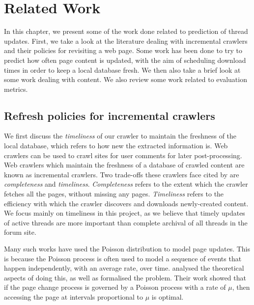 \chapter{Related Work}
In this chapter, we present some of the work done related to prediction of 
thread updates. First, we take a look at the literature dealing with incremental 
crawlers and their policies for revisiting a web page. Some work has been done 
to try to predict how often page content is updated, with the aim of scheduling 
download times in order to keep a local database fresh. We then also take a 
brief look at some work dealing with content. We also review some work related 
to evaluation metrics.

 


\section{Refresh policies for incremental crawlers}

We first discuss the \emph{timeliness} of our crawler to maintain the freshness 
of the local database, which refers to how new the extracted information is. Web 
crawlers can be used to crawl sites for user comments for 
later post-processing. Web crawlers which maintain the freshness of a database of 
crawled content are known as incremental crawlers. Two trade-offs these crawlers 
face cited by  are \emph{completeness} and \emph{timeliness}.  
\emph{Completeness} refers to the extent which the crawler fetches all the 
pages, without missing any pages. \emph{Timeliness} refers to the efficiency 
with which the crawler discovers and downloads newly-created content. We focus 
mainly on timeliness in this project, as we believe that timely updates of 
active threads are more important than complete archival of all threads in the 
forum site.

Many such works have used the Poisson distribution to model page updates.  
This is because the Poisson process is often used to model a sequence of events 
that happen independently, with an average rate, over time.  
 analysed the theoretical aspects of doing this, as well as 
formalised the problem. Their work showed that if the page change process is 
governed by a Poisson process with a rate of $\mu$, then accessing the page at 
intervals proportional to $\mu$ is optimal.

